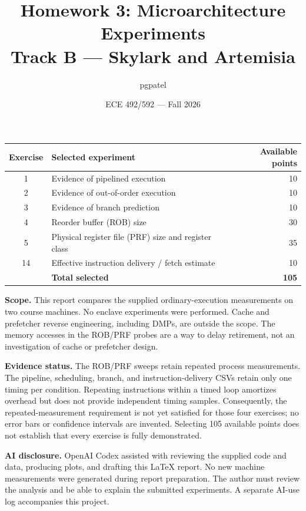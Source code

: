\documentclass[11pt]{article}
\title{Homework 3: Microarchitecture Experiments\\\large Track B --- Skylark and Artemisia}
\author{pgpatel} %
\date{ECE 492/592 --- Fall 2026}
\begin{document}
\maketitle
\begin{center}
\begin{tabular}{clr}\toprule
Exercise & Selected experiment & Available points\\\midrule
1 & Evidence of pipelined execution & 10\\
2 & Evidence of out-of-order execution & 10\\
3 & Evidence of branch prediction & 10\\
4 & Reorder buffer (ROB) size & 30\\
5 & Physical register file (PRF) size and register class & 35\\
14 & Effective instruction delivery / fetch estimate & 10\\\midrule
 & \textbf{Total selected} & \textbf{105}\\\bottomrule
\end{tabular}
\end{center}

\textbf{Scope.} This report compares the supplied ordinary-execution measurements on two course machines. No enclave experiments were performed. Cache and prefetcher reverse engineering, including DMPs, are outside the scope. The memory accesses in the ROB/PRF probes are a way to delay retirement, not an investigation of cache or prefetcher design.

\textbf{Evidence status.} The ROB/PRF sweeps retain repeated process measurements. The pipeline, scheduling, branch, and instruction-delivery CSVs retain only one timing per condition. Repeating instructions within a timed loop amortizes overhead but does not provide independent timing samples. Consequently, the repeated-measurement requirement is not yet satisfied for those four exercises; no error bars or confidence intervals are invented. Selecting 105 available points does not establish that every exercise is fully demonstrated.

\textbf{AI disclosure.} OpenAI Codex assisted with reviewing the supplied code and data, producing plots, and drafting this \LaTeX{} report. No new machine measurements were generated during report preparation. The author must review the analysis and be able to explain the submitted experiments. A separate AI-use log accompanies this project.
\end{document}
